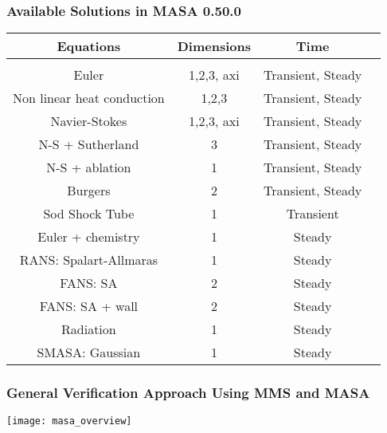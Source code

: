 \documentclass[mathserif]{beamer}
\begin{document}
\begin{frame}
  \frametitle{Available Solutions in MASA 0.50.0}

  \begin{table}
    \centering
    \begin{tabular}{c c c c}
      \hline
      Equations & Dimensions & Time \\
      \hline \vspace{-8pt} \\
      Euler                      & 1,2,3, axi & Transient, Steady \\
      Non linear heat conduction & 1,2,3 & Transient, Steady \\
      Navier-Stokes              & 1,2,3, axi & Transient, Steady \\
      N-S + Sutherland           &     3 & Transient, Steady \\
      N-S + ablation             &     1 & Transient, Steady \\
      Burgers                    &     2 & Transient, Steady \\ 
      Sod Shock Tube             &     1 & Transient \\
      Euler + chemistry          &     1 & Steady    \\
      RANS: Spalart-Allmaras     &     1 & Steady \\
      FANS: SA                   &     2 & Steady \\
      FANS: SA + wall            &     2 & Steady \\
      Radiation                  &     1 & Steady \\ 
      SMASA: Gaussian            &     1 & Steady \\ 
      \hline
    \end{tabular}
  \end{table}
\end{frame}


\begin{frame}
  \frametitle{General Verification Approach Using MMS and MASA}
  \begin{center}
    \texttt{[image: masa\_overview]} \\
  \end{center}
\end{frame}
\end{document}

